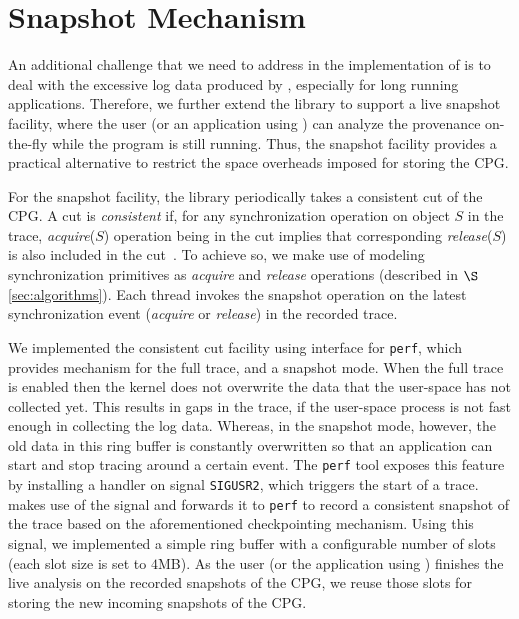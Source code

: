 \section{Snapshot Mechanism}
\label{sec:snapshot}

An additional challenge that we need to address in the implementation of \projecttitle is to deal with the excessive log data produced by \intelpt, especially for long running applications. Therefore, we further extend the library to support a live snapshot facility, where the user (or an application using \projecttitle) can analyze the provenance on-the-fly while the program is still running. Thus, the snapshot facility provides a practical alternative to restrict the space overheads imposed for storing the CPG. 

For the snapshot facility, the library periodically takes a consistent cut of the CPG. A cut is {\em consistent} if, for any synchronization operation on object $S$ in the trace,  {\em acquire}($S$) operation being in the cut implies that corresponding {\em release}($S$) is also included in the cut~\cite{chandy-lamport}.  To achieve so, we make use of modeling synchronization primitives as {\em acquire} and {\em release} operations (described in $\S$\ref{sec:algorithms}). Each thread invokes the snapshot operation on the latest synchronization event ({\em acquire} or {\em release}) in the recorded trace.


We implemented the consistent cut facility using \intelpt interface for {\tt perf},
which provides mechanism for the full trace, and a snapshot mode.
When the full trace is enabled then the kernel does not overwrite the data that the user-space has not collected yet. 
This results in gaps in the trace, if the user-space process is not fast enough in collecting the log data. 
Whereas, in the snapshot mode, however, the old data in this ring buffer is constantly overwritten so that an application
can start and stop tracing around a certain event. 
The {\tt perf} tool exposes this feature by installing a handler on
signal {\tt SIGUSR2}, which triggers the start of a trace. \projecttitle makes use of the signal
and forwards it to {\tt perf} to record a consistent snapshot of the trace based on the aforementioned checkpointing mechanism.  Using this signal, we implemented a simple ring buffer with a configurable number of slots (each slot size is set to $4$MB). As the user (or the application using \projecttitle) finishes the live analysis on the recorded snapshots of the CPG, we reuse those slots for storing the new incoming snapshots of the CPG. 

